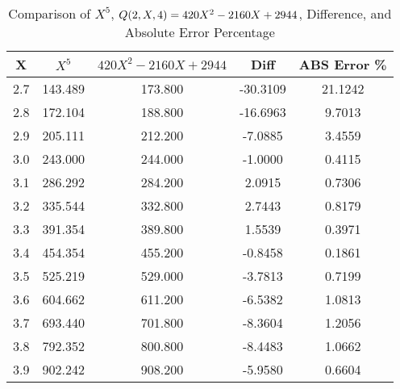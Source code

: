 ﻿%
\begin{table}[h!]
    \centering
    \caption{Comparison of $X^5$, ${Q}(2,X,4) = 420 X^2 - 2160 X + 2944$, Difference, and Absolute Error Percentage}
    \begin{tabular}{|c|c|c|c|c|}
        \hline
        \textbf{X} & \textbf{$X^5$} & \textbf{$420 X^2 - 2160 X + 2944$} & \textbf{Diff} & \textbf{ABS Error \%} \\ \hline
        2.7        & 143.489        & 173.800                            & -30.3109      & 21.1242               \\ \hline
        2.8        & 172.104        & 188.800                            & -16.6963      & 9.7013                \\ \hline
        2.9        & 205.111        & 212.200                            & -7.0885       & 3.4559                \\ \hline
        3.0        & 243.000        & 244.000                            & -1.0000       & 0.4115                \\ \hline
        3.1        & 286.292        & 284.200                            & 2.0915        & 0.7306                \\ \hline
        3.2        & 335.544        & 332.800                            & 2.7443        & 0.8179                \\ \hline
        3.3        & 391.354        & 389.800                            & 1.5539        & 0.3971                \\ \hline
        3.4        & 454.354        & 455.200                            & -0.8458       & 0.1861                \\ \hline
        3.5        & 525.219        & 529.000                            & -3.7813       & 0.7199                \\ \hline
        3.6        & 604.662        & 611.200                            & -6.5382       & 1.0813                \\ \hline
        3.7        & 693.440        & 701.800                            & -8.3604       & 1.2056                \\ \hline
        3.8        & 792.352        & 800.800                            & -8.4483       & 1.0662                \\ \hline
        3.9        & 902.242        & 908.200                            & -5.9580       & 0.6604                \\ \hline

\end{tabular}
\end{table}
